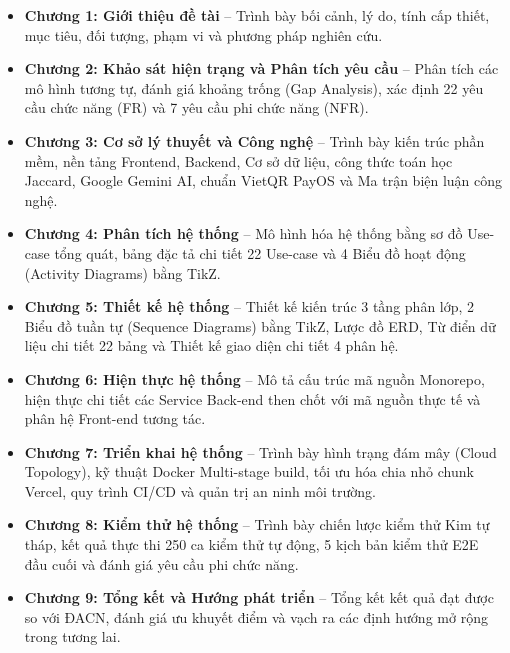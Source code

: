 \begin{itemize}
    \item \textbf{Chương 1: Giới thiệu đề tài} -- Trình bày bối cảnh, lý do, tính cấp thiết, mục tiêu, đối tượng, phạm vi và phương pháp nghiên cứu.
    \item \textbf{Chương 2: Khảo sát hiện trạng và Phân tích yêu cầu} -- Phân tích các mô hình tương tự, đánh giá khoảng trống (Gap Analysis), xác định 22 yêu cầu chức năng (FR) và 7 yêu cầu phi chức năng (NFR).
    \item \textbf{Chương 3: Cơ sở lý thuyết và Công nghệ} -- Trình bày kiến trúc phần mềm, nền tảng Frontend, Backend, Cơ sở dữ liệu, công thức toán học Jaccard, Google Gemini AI, chuẩn VietQR PayOS và Ma trận biện luận công nghệ.
    \item \textbf{Chương 4: Phân tích hệ thống} -- Mô hình hóa hệ thống bằng sơ đồ Use-case tổng quát, bảng đặc tả chi tiết 22 Use-case và 4 Biểu đồ hoạt động (Activity Diagrams) bằng TikZ.
    \item \textbf{Chương 5: Thiết kế hệ thống} -- Thiết kế kiến trúc 3 tầng phân lớp, 2 Biểu đồ tuần tự (Sequence Diagrams) bằng TikZ, Lược đồ ERD, Từ điển dữ liệu chi tiết 22 bảng và Thiết kế giao diện chi tiết 4 phân hệ.
    \item \textbf{Chương 6: Hiện thực hệ thống} -- Mô tả cấu trúc mã nguồn Monorepo, hiện thực chi tiết các Service Back-end then chốt với mã nguồn thực tế và phân hệ Front-end tương tác.
    \item \textbf{Chương 7: Triển khai hệ thống} -- Trình bày hình trạng đám mây (Cloud Topology), kỹ thuật Docker Multi-stage build, tối ưu hóa chia nhỏ chunk Vercel, quy trình CI/CD và quản trị an ninh môi trường.
    \item \textbf{Chương 8: Kiểm thử hệ thống} -- Trình bày chiến lược kiểm thử Kim tự tháp, kết quả thực thi 250 ca kiểm thử tự động, 5 kịch bản kiểm thử E2E đầu cuối và đánh giá yêu cầu phi chức năng.
    \item \textbf{Chương 9: Tổng kết và Hướng phát triển} -- Tổng kết kết quả đạt được so với ĐACN, đánh giá ưu khuyết điểm và vạch ra các định hướng mở rộng trong tương lai.
\end{itemize}